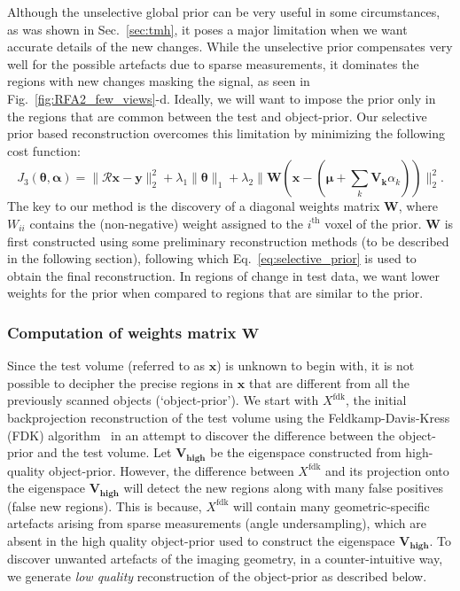 \documentclass[journal]{IEEEtran}
\begin{document}
Although the unselective global prior can be very useful in some circumstances, as was shown in Sec.~\ref{sec:tmh}, it poses a major limitation when we want accurate details of the new changes. While the unselective prior compensates very well for the possible artefacts due to sparse measurements, it dominates the regions with new changes masking the signal, as seen in Fig.~\ref{fig:RFA2_few_views}-d. Ideally, we will want to impose the prior only in the regions that are common between the test and object-prior.  Our selective prior based reconstruction overcomes this limitation by minimizing the following cost function:
\begin{equation}
J_3(\boldsymbol{\theta},\boldsymbol{\alpha}) = \lVert\boldsymbol{\mathcal{R} x}-\boldsymbol{y}\rVert_2^2  + \lambda_1\lVert\boldsymbol{\theta}\rVert_1 +\lambda_2\lVert\boldsymbol{W}(\boldsymbol{x} - (\boldsymbol{\mu} + \sum_{k}\boldsymbol{V_k}\alpha_k))\rVert_2^2.
\label{eq:selective_prior}
\end{equation}
The key to our method is the discovery of a diagonal weights
 matrix $\boldsymbol{W}$, where $W_{ii}$ contains the (non-negative) weight assigned to the $i^{\textrm{th}}$ voxel of the prior. $\boldsymbol{W}$ is first constructed using some preliminary reconstruction methods (to be described in the following section), following which Eq.~\ref{eq:selective_prior} is used to obtain the final reconstruction. In regions of change in test data, we want lower weights for the prior when compared to regions that are similar to the prior.  
\vspace{2mm}
 \subsubsection{\textbf{Computation of weights matrix $\boldsymbol{W}$}}
Since the test volume (referred to as $\boldsymbol{x}$) is unknown to begin with, it is not possible to decipher the precise regions in $\boldsymbol{x}$ that are different from all the previously scanned objects (`object-prior'). We start with $X^{\text{fdk}}$, the initial backprojection reconstruction of the test volume using the Feldkamp-Davis-Kress (FDK) algorithm~\cite{FDK} in an attempt to discover the difference between the object-prior and the test volume. Let $\boldsymbol{V_{\text{high}}}$ be the eigenspace constructed from high-quality object-prior. However, the difference between $X^{\text{fdk}}$ and its projection onto the eigenspace $\boldsymbol{V_{\text{high}}}$ will detect the new regions along with  many false positives (false new regions). This is because, $X^{\text{fdk}}$ will contain many geometric-specific artefacts arising from sparse measurements (angle undersampling), which are absent in the high quality object-prior used to construct the eigenspace $\boldsymbol{V_{\text{high}}}$. To discover unwanted artefacts of the imaging geometry, in a counter-intuitive way, we generate \emph{low quality} reconstruction of the object-prior as described below.
\vspace{2mm}
\end{document}
